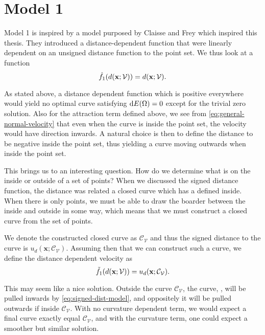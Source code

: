 \section{Model 1}\label{sec:model-1}
Model 1 is inspired by a model purposed by Claisse and Frey \cite{Claisse-Frey} which inspired this thesis. They introduced a distance-dependent function that were linearly dependent on an unsigned distance function to the point set. We thus look at a function
\begin{equation*}
    \hat{f}_1(d(\mathbf{x};\mathcal{V})) = d(\mathbf{x};\mathcal{V}).
    \label{eq:pure-dist-model}
\end{equation*}

As stated above, a distance dependent function which is positive everywhere would yield no optimal curve satisfying $\mathop{}\!\mathrm{d} E(\Omega) = 0$ except for the trivial zero solution. Also for the attraction term defined above, we see from \eqref{eq:general-normal-velocity} that even when the curve is inside the point set, the velocity would have direction inwards. A natural choice is then to define the distance to be negative inside the point set, thus yielding a curve moving outwards when inside the point set.

This brings us to an interesting question. How do we determine what is on the inside or outside of a set of points? When we discussed the signed distance function, the distance was related a closed curve which has a defined inside. When there is only points, we must be able to draw the boarder between the inside and outside in some way, which means that we must construct a closed curve from the set of points.

We denote the constructed closed curve as $\mathcal{C}_\mathcal{V}$ and thus the signed distance to the curve is $u_d(\mathbf{x}; \mathcal{C}_\mathcal{V})$. Assuming then that we can construct such a curve, we define the distance dependent velocity as 
\begin{equation}
    \tilde{f}_1(d(\mathbf{x};\mathcal{V})) = u_d(\mathbf{x}; \mathcal{C}_\mathcal{V}).
    \label{eq:signed-dist-model}
\end{equation}

This may seem like a nice solution. Outside the curve $\mathcal{C}_\mathcal{V}$, the curve, \curve, will be pulled inwards by \eqref{eq:signed-dist-model}, and oppositely it will be pulled outwards if inside $\mathcal{C}_\mathcal{V}$. With no curvature dependent term, we would expect a final curve exactly equal $\mathcal{C}_\mathcal{V}$, and with the curvature term, one could expect a smoother but similar solution. 

